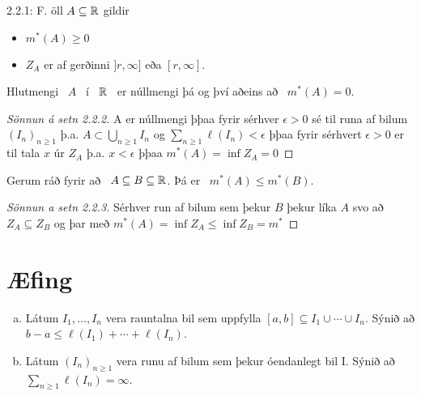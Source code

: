 \documentclass[12pt]{report}
\begin{document}
\begin{ath}2.2.1: F. öll $A \subseteq \mathbb{R}$ gildir
  \begin{itemize}
  \item $m^*(A) \geq 0$
  
  \item $Z_A$ er af gerðinni $]r, \infty]$ eða $[r,\infty]$.
  \end{itemize}
\end{ath}
\begin{setn*}

Hlutmengi \ $A$ \ í \ $\mathbb{R}$ \ er núllmengi þá og því aðeins að \ $m^*(A) = 0$.
\end{setn*}
\begin{proof}[Sönnun á setn 2.2.2]
  A er núllmengi þþaa fyrir sérhver $\epsilon > 0$ sé til runa af
  bilum $(I_n)_{n \geq 1}$ þ.a. $A \subset \bigcup_{n \geq 1} I_n$ og
  $\sum_{n \geq 1} \ell(I_n) < \epsilon$ þþaa fyrir sérhvert
  $\epsilon > 0$ er til tala $x$ úr $Z_A$ þ.a. $x < \epsilon$ þþaa
  $m^*(A) = \inf{Z_A} = 0$
\end{proof}

\begin{setn*}
Gerum ráð fyrir að  \ $A\subseteq B\subseteq \mathbb{R}$. Þá er  \ $m^*(A) \leq m^*(B)$.
\end{setn*}
\begin{proof}[Sönnun a setn 2.2.3] Sérhver run af bilum sem þekur $B$
  þekur líka $A$ svo að $Z_A \subseteq Z_B$ og þar með
  $m^{*}(A) = \inf{Z_A} \leq \inf{Z_B} = m^{*}$
\end{proof}

\section*{Æfing}
\begin{enumerate}[(a)]
\item Látum $I_1, \dotsc, I_n$ vera rauntalna bil sem uppfylla
  $[a,b] \subseteq I_1 \cup \dotsb \cup I_n$. Sýnið að
  $b - a \leq \ell(I_1) + \dotsb + \ell(I_n)$.
\item Látum $(I_n)_{n \geq 1}$ vera runu af bilum sem þekur óendanlegt
  bil I. Sýnið að $\sum_{n \geq 1} \ell(I_n) = \infty$.
\end{enumerate}
\end{document}

